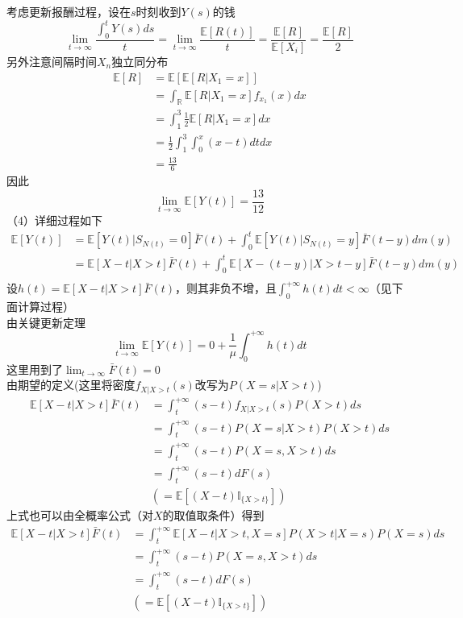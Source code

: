 \documentclass[UTF8,openany]{book}
\begin{document}
考虑更新报酬过程，设在$s$时刻收到$Y(s)$的钱
\[
\lim_{t\rightarrow \infty}\frac{\int_{0}^{t} Y(s)ds}{t}=\lim_{t\rightarrow \infty}\frac{\mathbb{E}\left[R(t) \right] }{t}=\frac{\mathbb{E}\left[ R\right] }{\mathbb{E}[X_i]}=\frac{\mathbb{E}\left[R\right] }{2}
\]
另外注意间隔时间$X_n$独立同分布
$$
\begin{aligned}
	\mathbb{E}[R]&=\mathbb{E}\left[\mathbb{E}\left[R\left| X_1=x\right. \right]  \right] \\
	&=\int_{\mathbb{R}} \mathbb{E}[R|X_1=x]f_{x_1}(x)dx\\
	&=\int_{1}^{3} \frac{1}{2}\mathbb{E}[R|X_1=x]dx\\
	&=\frac{1}{2}\int_{1}^{3} \int_{0}^{x}(x-t)dtdx\\
	&=\frac{13}{6}
\end{aligned}
$$
因此
\[
\lim_{t\to \infty}\mathbb{E}[Y(t)]=\frac{13}{12}
\]
（4）详细过程如下
\begin{align*}
	\mathbb{E}[Y(t)]&=\mathbb{E}\left[ Y(t)|S_{N(t)}=0 \right]\bar{F}(t) +
	\int_{0}^{t} \mathbb{E}\left[ Y(t)|S_{N(t)}=y \right]\bar{F}(t-y)dm(y)\\
	&=\mathbb{E}\left[X-t|X>t \right]\bar{F}(t)+ 	\int_{0}^{t} \mathbb{E}\left[X-(t-y)|X>t-y \right]\bar{F}(t-y)dm(y)\\
\end{align*}
设$h(t)=\mathbb{E}\left[X-t|X>t \right]\bar{F}(t)$，则其非负不增，且$\int_{0}^{+\infty} h(t)dt<\infty$（见下面计算过程）\\
由关键更新定理
\[
\lim_{t\to \infty}\mathbb{E}[Y(t)]=0+\frac{1}{\mu}\int_{0}^{+\infty}h(t)dt
\]
这里用到了$\lim_{t\to \infty}\bar{F}(t)=0$\\
由期望的定义(这里将密度$f_{X|X>t}(s)$改写为$P(X=s|X>t)$)
$$
\begin{aligned}
	\mathbb{E}\left[X-t|X>t \right]\bar{F}(t)&=\int_{t}^{+\infty}(s-t) f_{X|X>t}(s)P(X>t)ds\\
	&=\int_{t}^{+\infty}(s-t) P(X=s|X>t)P(X>t)ds\\
	&=\int_{t}^{+\infty} (s-t)P(X=s,X>t)ds\\
	&=\int_{t}^{+\infty} (s-t)dF(s)\\
	&\left( =\mathbb{E}\left[(X-t) \mathbb{I}_{\{X >t\}}\right]\right)  
\end{aligned}
$$
上式也可以由全概率公式（对$X$的取值取条件）得到
$$
\begin{aligned}
	\mathbb{E}\left[X-t|X>t \right]\bar{F}(t)&=\int_{t}^{+\infty}\mathbb{E}\left[X-t|X>t,X=s \right] P(X>t|X=s)P(X=s)ds\\
	&=\int_{t}^{+\infty} (s-t)P(X=s,X>t)ds\\
	&=\int_{t}^{+\infty} (s-t)dF(s)\\
	&\left( =\mathbb{E}\left[(X-t) \mathbb{I}_{\{X >t\}}\right]\right)  
\end{aligned}
$$
\end{document}

